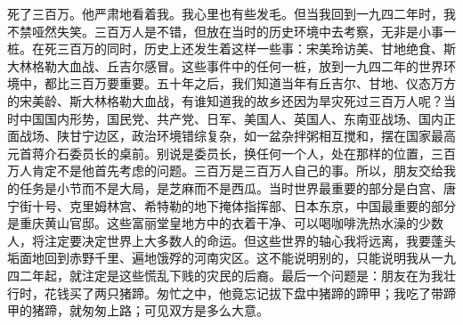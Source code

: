 死了三百万。他严肃地看着我。我心里也有些发毛。但当我回到一九四二年时，我不禁哑然失笑。三百万人是不错，但放在当时的历史环境中去考察，无非是小事一桩。在死三百万的同时，历史上还发生着这样一些事：宋美玲访美、甘地绝食、斯大林格勒大血战、丘吉尔感冒。这些事件中的任何一桩，放到一九四二年的世界环境中，都比三百万要重要。五十年之后，我们知道当年有丘吉尔、甘地、仪态万方的宋美龄、斯大林格勒大血战，有谁知道我的故乡还因为旱灾死过三百万人呢？当时中国国内形势，国民党、共产党、日军、美国人、英国人、东南亚战场、国内正面战场、陕甘宁边区，政治环境错综复杂，如一盆杂拌粥相互搅和，摆在国家最高元首蒋介石委员长的桌前。别说是委员长，换任何一个人，处在那样的位置，三百万人肯定不是他首先考虑的问题。三百万是三百万人自己的事。所以，朋友交给我的任务是小节而不是大局，是芝麻而不是西瓜。当时世界最重要的部分是白宫、唐宁街十号、克里姆林宫、希特勒的地下掩体指挥部、日本东京，中国最重要的部分是重庆黄山官邸。这些富丽堂皇地方中的衣着干净、可以喝咖啡洗热水澡的少数人，将注定要决定世界上大多数人的命运。但这些世界的轴心我将远离，我要蓬头垢面地回到赤野千里、遍地饿殍的河南灾区。这不能说明别的，只能说明我从一九四二年起，就注定是这些慌乱下贱的灾民的后裔。最后一个问题是：朋友在为我壮行时，花钱买了两只猪蹄。匆忙之中，他竟忘记拔下盘中猪蹄的蹄甲；我吃了带蹄甲的猪蹄，就匆匆上路；可见双方是多么大意。\\